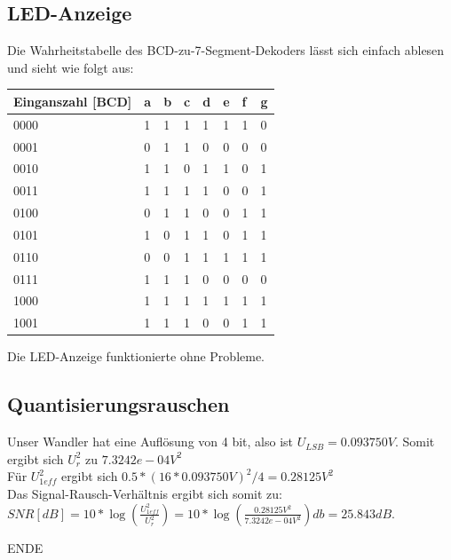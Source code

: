 \subsection{LED-Anzeige}
Die Wahrheitstabelle des BCD-zu-7-Segment-Dekoders lässt sich einfach ablesen und sieht wie folgt aus:\\
\begin{tabular}{l|lllllll}
	Einganszahl [BCD] & a & b & c & d & e & f & g\\
	\hline
	0000	& 1 & 1 & 1 & 1 & 1 & 1 & 0\\
	0001	& 0 & 1 & 1 & 0 & 0 & 0 & 0\\
	0010	& 1 & 1 & 0 & 1 & 1 & 0 & 1\\
	0011	& 1 & 1 & 1 & 1 & 0 & 0 & 1\\
	0100	& 0 & 1 & 1 & 0 & 0 & 1 & 1\\
	0101	& 1 & 0 & 1 & 1 & 0 & 1 & 1\\
	0110	& 0 & 0 & 1 & 1 & 1 & 1 & 1\\
	0111	& 1 & 1 & 1 & 0 & 0 & 0 & 0\\
	1000	& 1 & 1 & 1 & 1 & 1 & 1 & 1\\
	1001	& 1 & 1 & 1 & 0 & 0 & 1 & 1\\
\end{tabular}
Die LED-Anzeige funktionierte ohne Probleme.

\subsection{Quantisierungsrauschen}
Unser Wandler hat eine Auflösung von 4 bit, also ist $U_{LSB}=0.093750V$. Somit ergibt sich $U_r^2$ zu $7.3242e-04 V^2$\\
Für $U_{1eff}^2$ ergibt sich $0.5*(16*0.093750V)^2/4=0.28125V^2$\\
Das Signal-Rausch-Verhältnis ergibt sich somit zu: $SNR [dB] = 10*\log \left(\frac{U_{1eff}^2}{U_r^2}\right) = 10*\log\left(\frac{0.28125V^2}{7.3242e-04 V^2}\right) db=25.843 dB$.

\vspace{2cm}
\Huge{ENDE}




